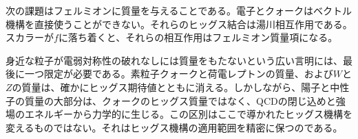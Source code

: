 次の課題はフェルミオンに質量を与えることである。電子とクォークはベクトル機構を直接使うことができない。それらのヒッグス結合は湯川相互作用である。スカラーが\(f\)に落ち着くと、それらの相互作用はフェルミオン質量項になる。

身近な粒子が電弱対称性の破れなしには質量をもたないという広い言明には、最後に一つ限定が必要である。素粒子クォークと荷電レプトンの質量、および\(W\)と\(Z\)の質量は、確かにヒッグス期待値とともに消える。しかしながら、陽子と中性子の質量の大部分は、クォークのヒッグス質量ではなく、QCDの閉じ込めと強場のエネルギーから力学的に生じる。この区別はここで導かれたヒッグス機構を変えるものではない。それはヒッグス機構の適用範囲を精密に保つのである。